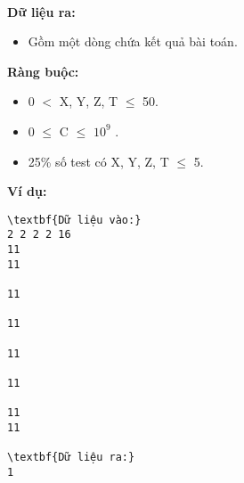  

\textbf{Dữ liệu ra: }
\begin{itemize}
	\item 

Gồm một dòng chứa kết quả bài toán.
\end{itemize}

\textbf{Ràng buộc: }
\begin{itemize}
	\item 0 $<$ X, Y, Z, T  $\le$  50.
	\item 0  $\le$  C  $\le$  $10^{9}$ .
	\item 25\% số test có X, Y, Z, T  $\le$  5.
\end{itemize}

\textbf{Ví dụ: }
\begin{verbatim}
\textbf{Dữ liệu vào:}
2 2 2 2 16
11
11

11

11

11

11

11
11

\textbf{Dữ liệu ra:}
1
\end{verbatim}
